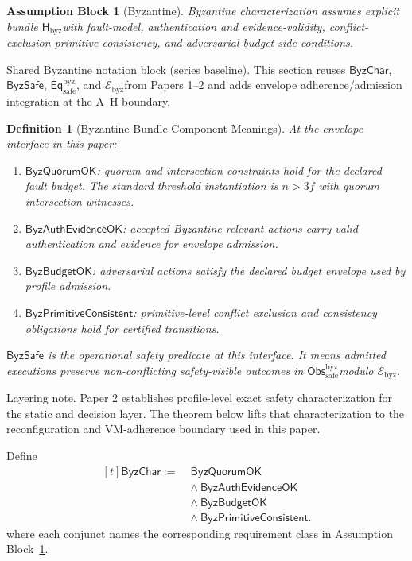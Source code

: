 \documentclass[a4paper,10pt,twocolumn,english]{article}
\numberwithin{equation}{section}
\theoremstyle{paperdef}
\newtheorem{definition}{Definition}[section]
\theoremstyle{paperplain}
\theoremstyle{paperdef}
\theoremstyle{paperremark}
\theoremstyle{paperdef}
\newtheorem{assumptions}[assumption]{Assumption Block}
\newcommand{\Hbyz}{\ensuremath{\mathsf{H}_{\mathrm{byz}}}}
\newcommand{\Obssafe}{\ensuremath{\mathsf{Obs}_{\mathrm{safe}}^{\mathrm{byz}}}}
\newcommand{\Eqsafe}{\ensuremath{\mathsf{Eq}_{\mathrm{safe}}^{\mathrm{byz}}}}
\newcommand{\Ebyz}{\ensuremath{\mathcal{E}_{\mathrm{byz}}}}
\newcommand{\ByzSafe}{\ensuremath{\mathsf{ByzSafe}}}
\newcommand{\ByzChar}{\ensuremath{\mathsf{ByzChar}}}
\begin{document}
\begin{assumptions}[Byzantine]
	\label{assump:p3-byzantine}
	Byzantine characterization assumes explicit bundle \Hbyz with fault-model, authentication and evidence-validity, conflict-exclusion primitive consistency, and adversarial-budget side conditions.
\end{assumptions}

Shared Byzantine notation block (series baseline). This section reuses
$\ByzChar$, $\ByzSafe$, \Eqsafe, and \Ebyz from Papers 1--2 and adds envelope
adherence/admission integration at the A--H boundary.

\begin{definition}[Byzantine Bundle Component Meanings]
	At the envelope interface in this paper:
	\begin{enumerate}
		\item $\mathsf{ByzQuorumOK}$: quorum and intersection constraints hold for the declared fault budget. The standard threshold instantiation is $n>3f$ with quorum intersection witnesses.
		\item $\mathsf{ByzAuthEvidenceOK}$: accepted Byzantine-relevant actions carry valid authentication and evidence for envelope admission.
		\item $\mathsf{ByzBudgetOK}$: adversarial actions satisfy the declared budget envelope used by profile admission.
		\item $\mathsf{ByzPrimitiveConsistent}$: primitive-level conflict exclusion and consistency obligations hold for certified transitions.
	\end{enumerate}
	$\ByzSafe$ is the operational safety predicate at this interface. It means admitted executions preserve non-conflicting safety-visible outcomes in \Obssafe modulo \Ebyz.
\end{definition}

Layering note. Paper 2 establishes profile-level exact safety characterization
for the static and decision layer. The theorem below lifts that characterization
to the reconfiguration and VM-adherence boundary used in this paper.

Define
\begin{equation}
	\begin{aligned}[t]
		\ByzChar
		:=\; & \mathsf{ByzQuorumOK}                    \\
		     & \land\ \mathsf{ByzAuthEvidenceOK}       \\
		     & \land\ \mathsf{ByzBudgetOK}             \\
		     & \land\ \mathsf{ByzPrimitiveConsistent}.
	\end{aligned}
\end{equation}
where each conjunct names the corresponding requirement class in Assumption Block~\ref{assump:p3-byzantine}.
\end{document}
